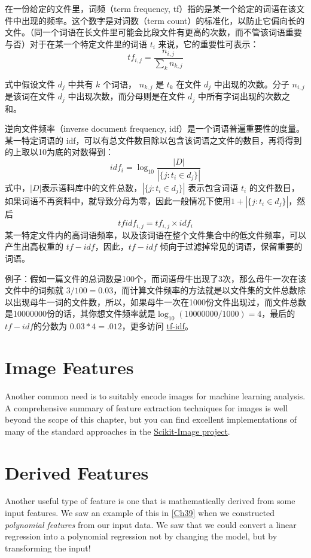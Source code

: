 在一份给定的文件里，词频（term frequency, tf）指的是某一个给定的词语在该文件中出现的频率。这个数字是对词数（term count）的标准化，以防止它偏向长的文件。（同一个词语在长文件里可能会比段文件有更高的次数，而不管该词语重要与否）对于在某一个特定文件里的词语 $t_i$ 来说，它的重要性可表示：
\begin{equation}
    tf_{i,j}=\frac{n_{i,j}}{\sum_k n_{k,j}}
\end{equation}

式中假设文件 $d_j$ 中共有 $k$ 个词语， $n_{k, j}$ 是 $t_k$ 在文件 $d_j$ 中出现的次数。分子 $n_{i,j}$ 是该词在文件 $d_j$ 中出现次数，而分母则是在文件 $d_j$ 中所有字词出现的次数之和。

逆向文件频率（inverse document frequency, idf）是一个词语普遍重要性的度量。某一特定词语的 idf，可以有总文件数目除以包含该词语之文件的数目，再将得到的上取以10为底的对数得到：
\begin{equation}
    idf_i=\log_{10}\frac{|D|}{|\{j:t_i\in d_j\}|}
\end{equation}
式中，$|D|$表示语料库中的文件总数，$|\{j:t_i\in d_j\}|$ 表示包含词语 $t_i$ 的文件数目，如果词语不再资料中，就导致分母为零，因此一般情况下使用$1+ |\{j:t_i\in d_j\}|$，然后
\begin{equation}
    tfidf_{i,j}=tf_{i,j}\times idf_i
\end{equation}
某一特定文件内的高词语频率，以及该词语在整个文件集合中的低文件频率，可以产生出高权重的 $tf-idf$，因此，$tf-idf$ 倾向于过滤掉常见的词语，保留重要的词语。

例子：假如一篇文件的总词数是100个，而词语母牛出现了3次，那么母牛一次在该文件中的词频就 $3/100=0.03$，而计算文件频率的方法就是以文件集的文件总数除以出现母牛一词的文件数，所以，如果母牛一次在1000份文件出现过，而文件总数是10000000份的话，其你想文件频率就是$\log_{10}(10000000/1000)=4$，最后的 $tf-idf$的分数为 $0.03 * 4=.012$，更多访问 \href{https://zh.wikipedia.org/wiki/Tf-idf}{tf-idf}。

\section{Image Features}
Another common need is to suitably encode images for machine learning analysis. A comprehensive summary of feature extraction techniques for images is well beyond
the scope of this chapter, but you can find excellent implementations of many of the
standard approaches in the \href{https://scikit-image.org/}{Scikit-Image project}.

\section{Derived Features}
Another useful type of feature is one that is mathematically derived from some input features. We saw an example of this in \autoref{Ch39} when we constructed \textit{polynomial features} from our input data. We saw that we could convert a linear regression into a polynomial regression not by changing the model, but by transforming the input!

